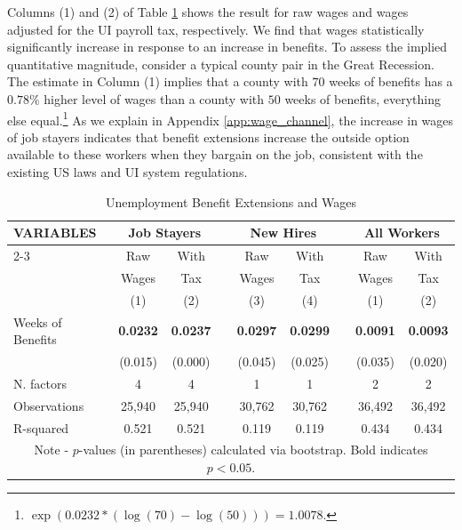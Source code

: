 \documentclass[12pt]{article}
\newcommand{\1}{\mathbf{1}}
\begin{document}
\begin{appendix}
Columns (1) and (2) of Table \ref{tab:app_Benefits_on_Wages} shows the result for raw wages and wages adjusted for the UI payroll tax, respectively. We find that wages statistically significantly increase in response to an increase in benefits. To assess the implied quantitative magnitude, consider a typical county pair in the Great Recession. The estimate in Column (1) implies that a county with $70$ weeks of benefits has a $0.78\%$ higher level of wages than a county with $50$ weeks of benefits, everything else equal.\footnote{$\exp(0.0232*(\log(70)-\log(50)))
= 1.0078.$} As we explain in Appendix \ref{app:wage_channel}, the increase in wages of job stayers indicates that benefit extensions increase the outside option available to these workers when they bargain on the job, consistent with the existing US laws and UI system regulations.

\begin{table}[t]
  \centering
   \caption{Unemployment Benefit Extensions and Wages} \label{tab:app_Benefits_on_Wages}
\small
\begin{tabular}{lcccccccc} \hline
    VARIABLES & \multicolumn{2}{c}{Job Stayers} &&  \multicolumn{2}{c}{New Hires} &&  \multicolumn{2}{c}{All Workers}\\ \cline{2-3} \cline{5-6} \cline{8-9}
    				  & Raw    & With && Raw   & With && Raw   & With\\
    				  & Wages  & Tax  && Wages & Tax  && Wages & Tax\\
    				  & (1) & (2) && (3) & (4) && (1) & (2)\\ \hline \noalign{\vskip 1mm}
Weeks of  Benefits & \bf{0.0232} & \bf{0.0237} && \bf{0.0297} & \bf{0.0299} &&  \bf{0.0091} & \bf{0.0093}\\
									 & (0.015)	  & (0.000)	 	 &&  (0.045)   	& (0.025)    && (0.035)	& (0.020)\\ \noalign{\vskip 1mm}

N. factors   & 4 & 4 && 1 & 1 && 2 & 2  \\
Observations & 25,940 & 25,940 && 30,762 & 30,762 && 36,492 & 36,492  \\
R-squared    & 0.521 & 0.521 && 0.119 & 0.119 && 0.434 & 0.434  \\  \hline
\multicolumn{9}{c}{\footnotesize Note - $p$-values (in parentheses) calculated via bootstrap. Bold indicates $p<0.05$.} \\
\end{tabular}
\vspace{-0.2cm}
\end{table}




\end{appendix}
\end{document}
